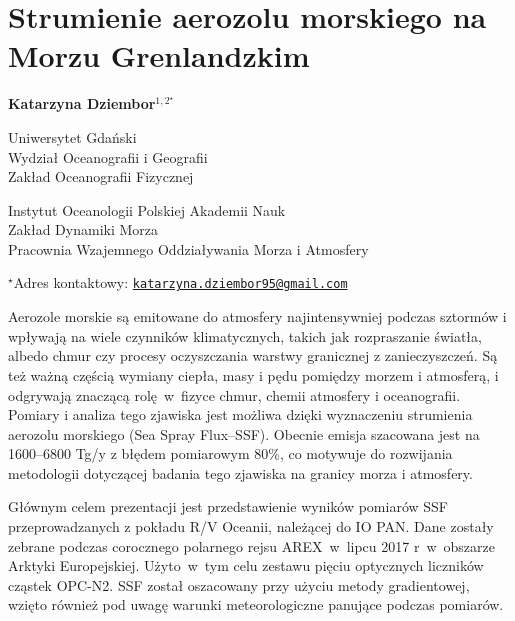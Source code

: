 \documentclass[\main/boa.tex]{subfiles}
\begin{document}
\section{Strumienie aerozolu morskiego na Morzu Grenlandzkim }

\begin{center}
  {\bf {} Katarzyna Dziembor$^{1,2^\star}$ }
\end{center}

\vskip 0.3cm

\begin{affiliations}
\begin{enumerate}
\begin{minipage}{0.915\textwidth}
\centering
\item Uniwersytet Gdański\\ Wydział Oceanografii i Geografii\\ Zakład Oceanografii Fizycznej
\item Instytut Oceanologii Polskiej Akademii Nauk \\ Zakład Dynamiki Morza \\ Pracownia Wzajemnego Oddziaływania Morza i Atmosfery\\[-2pt]
\end{minipage}
\end{enumerate}
$^\star$Adres kontaktowy: \href{mailto:katarzyna.dziembor95@gmail.com}{\nolinkurl{katarzyna.dziembor95@gmail.com}}\\
\end{affiliations}

\vskip 0.5cm


\vskip 0.5cm

Aerozole morskie są emitowane do atmosfery najintensywniej podczas sztormów i wpływają na wiele czynników klimatycznych, takich jak rozpraszanie światła, albedo chmur czy procesy oczyszczania warstwy granicznej z zanieczyszczeń. Są też ważną częścią wymiany ciepła, masy i pędu pomiędzy morzem i atmosferą, i odgrywają znaczącą rolę~w~fizyce chmur, chemii atmosfery i oceanografii. Pomiary i analiza tego zjawiska jest możliwa dzięki wyznaczeniu strumienia aerozolu morskiego (Sea Spray Flux--SSF). Obecnie emisja szacowana jest na 1600–6800 Tg/y z błędem pomiarowym 80\%, co motywuje do rozwijania metodologii dotyczącej badania tego zjawiska na granicy morza i atmosfery. 

Głównym celem prezentacji jest przedstawienie wyników pomiarów SSF przeprowadzanych z pokładu R/V Oceanii, należącej do IO PAN. Dane zostały zebrane podczas corocznego polarnego rejsu AREX~w~lipcu 2017 r~w~obszarze Arktyki Europejskiej. Użyto~w~tym celu zestawu pięciu optycznych liczników cząstek OPC-N2. SSF został oszacowany przy użyciu metody gradientowej, wzięto również pod uwagę warunki meteorologiczne panujące podczas pomiarów.
\end{document}
